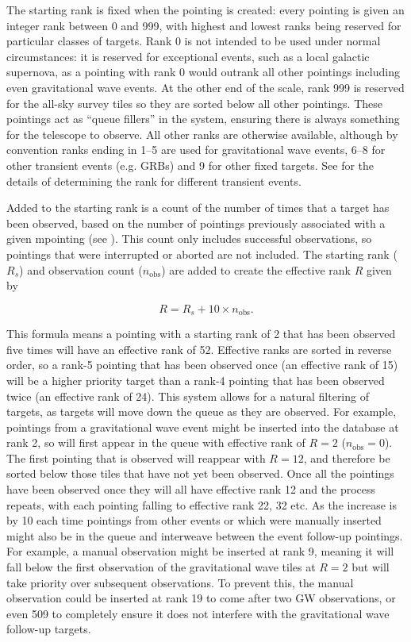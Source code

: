 \begin{colsection}
\begin{colsection}
The starting rank is fixed when the pointing is created: every pointing is given an integer rank between 0 and 999, with highest and lowest ranks being reserved for particular classes of targets. Rank 0 is not intended to be used under normal circumstances: it is reserved for exceptional events, such as a local galactic supernova, as a pointing with rank 0 would outrank all other pointings including even gravitational wave events. At the other end of the scale, rank 999 is reserved for the all-sky survey tiles so they are sorted below all other pointings. These pointings act as ``queue fillers'' in the system, ensuring there is always something for the telescope to observe. All other ranks are otherwise available, although by convention ranks ending in 1--5 are used for gravitational wave events, 6--8 for other transient events (e.g. GRBs) and 9 for other fixed targets. See  for the details of determining the rank for different transient events.

Added to the starting rank is a count of the number of times that a target has been observed, based on the number of pointings previously associated with a given mpointing (see ). This count only includes successful observations, so pointings that were interrupted or aborted are not included. The starting rank ($R_s$) and observation count ($n_\text{obs}$) are added to create the effective rank $R$ given by

\begin{equation}
    R = R_s + 10\times n_\text{obs}.
    \label{eq:effective_rank}
\end{equation}

This formula means a pointing with a starting rank of 2 that has been observed five times will have an effective rank of 52. Effective ranks are sorted in reverse order, so a rank-5 pointing that has been observed once (an effective rank of 15) will be a higher priority target than a rank-4 pointing that has been observed twice (an effective rank of 24). This system allows for a natural filtering of targets, as targets will move down the queue as they are observed. For example, pointings from a gravitational wave event might be inserted into the database at rank 2, so will first appear in the queue with effective rank of $R=2$ ($n_\text{obs}=0$). The first pointing that is observed will reappear with $R=12$, and therefore be sorted below those tiles that have not yet been observed. Once all the pointings have been observed once they will all have effective rank 12 and the process repeats, with each pointing falling to effective rank 22, 32 etc. As the increase is by 10 each time pointings from other events or which were manually inserted might also be in the queue and interweave between the event follow-up pointings. For example, a manual observation might be inserted at rank 9, meaning it will fall below the first observation of the gravitational wave tiles at $R=2$ but will take priority over subsequent observations. To prevent this, the manual observation could be inserted at rank 19 to come after two GW observations, or even 509 to completely ensure it does not interfere with the gravitational wave follow-up targets.


\end{colsection}
\end{colsection}
